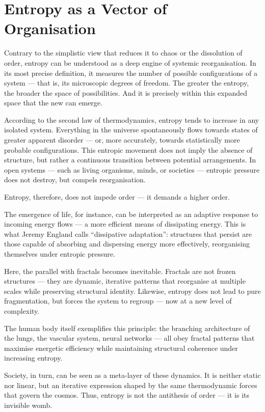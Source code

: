 \section{Entropy as a Vector of Organisation}

Contrary to the simplistic view that reduces it to chaos or the dissolution of order, entropy can be understood as a deep engine of systemic reorganisation. In its most precise definition, it measures the number of possible configurations of a system — that is, its microscopic degrees of freedom. The greater the entropy, the broader the space of possibilities. And it is precisely within this expanded space that the new can emerge.

According to the second law of thermodynamics, entropy tends to increase in any isolated system. Everything in the universe spontaneously flows towards states of greater apparent disorder — or, more accurately, towards statistically more probable configurations. This entropic movement does not imply the absence of structure, but rather a continuous transition between potential arrangements. In open systems — such as living organisms, minds, or societies — entropic pressure does not destroy, but compels reorganisation.

Entropy, therefore, does not impede order — it demands a higher order.

The emergence of life, for instance, can be interpreted as an adaptive response to incoming energy flows — a more efficient means of dissipating energy. This is what Jeremy England calls “dissipative adaptation”: structures that persist are those capable of absorbing and dispersing energy more effectively, reorganising themselves under entropic pressure.

Here, the parallel with fractals becomes inevitable. Fractals are not frozen structures — they are dynamic, iterative patterns that reorganise at multiple scales while preserving structural identity. Likewise, entropy does not lead to pure fragmentation, but forces the system to regroup — now at a new level of complexity.

The human body itself exemplifies this principle: the branching architecture of the lungs, the vascular system, neural networks — all obey fractal patterns that maximise energetic efficiency while maintaining structural coherence under increasing entropy.

Society, in turn, can be seen as a meta-layer of these dynamics. It is neither static nor linear, but an iterative expression shaped by the same thermodynamic forces that govern the cosmos. Thus, entropy is not the antithesis of order — it is its invisible womb.